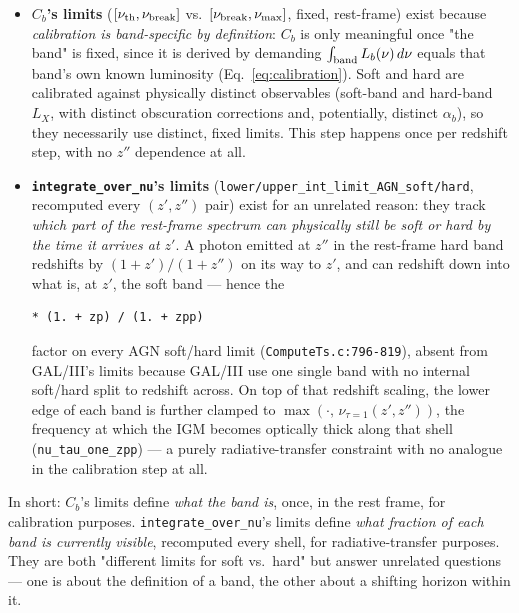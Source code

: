 \documentclass[11pt]{article}
\newcommand{\code}[1]{\texttt{#1}}
\begin{document}
\begin{itemize}
  \item \textbf{$C_b$'s limits} ($[\nu_{\rm th},\nu_{\rm break}]$ vs.\
    $[\nu_{\rm break},\nu_{\rm max}]$, fixed, rest-frame) exist because
    \emph{calibration is band-specific by definition}: $C_b$ is only
    meaningful once "the band" is fixed, since it is derived by demanding
    $\int_{\rm band} L_b(\nu)\,d\nu$ equals that band's own known
    luminosity (Eq.~\eqref{eq:calibration}). Soft and hard are calibrated
    against physically distinct observables (soft-band and hard-band $L_X$,
    with distinct obscuration corrections and, potentially, distinct
    $\alpha_b$), so they necessarily use distinct, fixed limits. This step
    happens once per redshift step, with no $z''$ dependence at all.

  \item \textbf{\code{integrate\_over\_nu}'s limits}
    (\code{lower/upper\_int\_limit\_AGN\_soft/hard}, recomputed every
    $(z',z'')$ pair) exist for an unrelated reason: they track \emph{which
    part of the rest-frame spectrum can physically still be soft or hard by
    the time it arrives at $z'$}. A photon emitted at $z''$ in the rest-frame
    hard band redshifts by $(1+z')/(1+z'')$ on its way to $z'$, and can
    redshift down into what is, at $z'$, the soft band — hence the
    \begin{verbatim}
* (1. + zp) / (1. + zpp)
\end{verbatim}
    factor on every AGN soft/hard limit (\code{ComputeTs.c:796-819}), absent
    from GAL/III's limits because GAL/III use one single band with no
    internal soft/hard split to redshift across. On top of that redshift
    scaling, the lower edge of each band is further clamped to
    $\max(\cdot,\, \nu_{\tau=1}(z',z''))$, the frequency at which the IGM
    becomes optically thick along that shell (\code{nu\_tau\_one\_zpp}) —
    a purely radiative-transfer constraint with no analogue in the
    calibration step at all.
\end{itemize}

In short: $C_b$'s limits define \emph{what the band is}, once, in the
rest frame, for calibration purposes. \code{integrate\_over\_nu}'s limits
define \emph{what fraction of each band is currently visible}, recomputed
every shell, for radiative-transfer purposes. They are both "different
limits for soft vs.\ hard" but answer unrelated questions — one is about
the definition of a band, the other about a shifting horizon within it.
\end{document}
